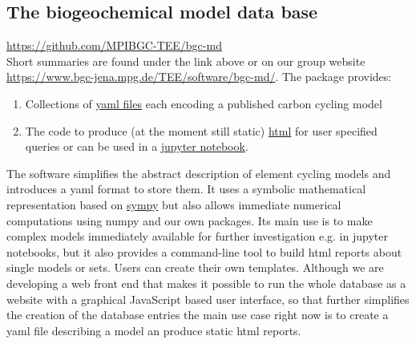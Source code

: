 \documentclass[a4paper]{article}
\begin{document}
\subsection{The biogeochemical model data base}
\url{https://github.com/MPIBGC-TEE/bgc-md}\\
Short summaries are found under the link above or on our group website \url{https://www.bgc-jena.mpg.de/TEE/software/bgc-md/}.
The package provides: 
\begin{enumerate} 
	\item
	Collections of \href{https://github.com/MPIBGC-TEE/bgc-md/tree/master/bgc_md/data/all_records}{yaml files} each encoding a published carbon cycling model  
	
	\item 
		The code to produce (at the moment still static) \href{https://www.bgc-jena.mpg.de/TEE/software/bgc-md/vegetation/list_report_v.html}{html} for user specified queries or can be used in a \href{https://github.com/MPIBGC-TEE/bgc-md/blob/master/jupyter_notebooks/Examples/how_to_apply_toolkit_to_yaml_model.ipynb}{jupyter notebook}. 
\end{enumerate} 
The software simplifies the abstract description of element cycling models and introduces a yaml format to store them. It uses a symbolic mathematical representation based on \href{http://www.sympy.org/en/index.htmlhttp://www.sympy.org/en/index.html}{sympy} but also allows immediate numerical computations using numpy and our own packages. 
Its main use is to make complex models immediately available for further investigation e.g. in jupyter notebooks, but it also provides a command-line tool to build html reports about single models or sets. Users can create their own templates.
Although we are developing a web front end that makes it possible to run the whole database as a website with a graphical JavaScript based user interface, so that further simplifies the creation of the database entries the main use case right now is to create a yaml file describing a model  an produce static html reports.
\end{document}
